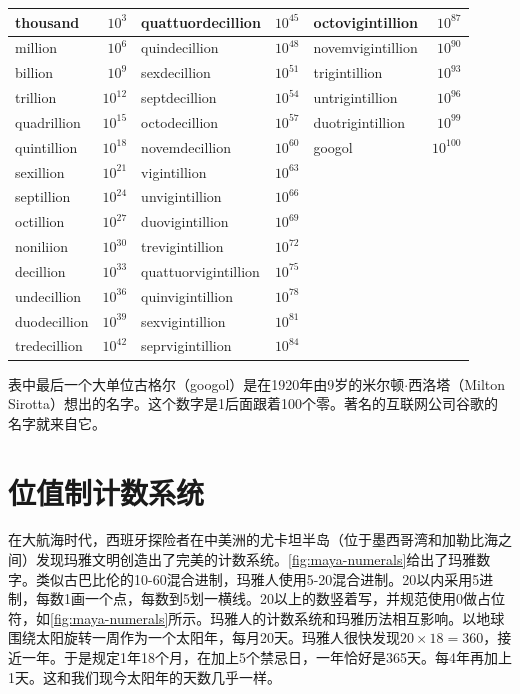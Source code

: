 \documentclass[b5paper]{ctexart}
\begin{document}
\begin{center}
\begin{tabular}{|l|r|l|r|l|r|}
\hline
thousand & $10^{3}$ & quattuordecillion & $10^{45}$ & octovigintillion & $10^{87}$ \\
\hline
million & $10^{6}$ & quindecillion & $10^{48}$ & novemvigintillion & $10^{90}$ \\
\hline
billion & $10^{9}$ & sexdecillion & $10^{51}$ & trigintillion & $10^{93}$ \\
\hline
trillion  & $10^{12}$ & septdecillion & $10^{54}$ & untrigintillion & $10^{96}$ \\
\hline
quadrillion  & $10^{15}$ & octodecillion & $10^{57}$ & duotrigintillion & $10^{99}$ \\
\hline
quintillion  & $10^{18}$ & novemdecillion & $10^{60}$ & googol & $10^{100}$ \\
\hline
sexillion    & $10^{21}$ & vigintillion & $10^{63}$ & & \\
\hline
septillion   & $10^{24}$ & unvigintillion & $10^{66}$ & & \\
\hline
octillion    & $10^{27}$ & duovigintillion & $10^{69}$ & & \\
\hline
noniliion  & $10^{30}$ & trevigintillion & $10^{72}$ & & \\
\hline
decillion  & $10^{33}$ & quattuorvigintillion & $10^{75}$ & & \\
\hline
undecillion   & $10^{36}$ & quinvigintillion & $10^{78}$ & & \\
\hline
duodecillion  & $10^{39}$ & sexvigintillion & $10^{81}$ & & \\
\hline
tredecillion  & $10^{42}$ & seprvigintillion & $10^{84}$ & & \\
\hline
\end{tabular}
\end{center}

表中最后一个大单位古格尔（googol）是在1920年由9岁的米尔顿$\cdot$西洛塔（Milton Sirotta）想出的名字。这个数字是1后面跟着100个零。著名的互联网公司谷歌的名字就来自它。

\section{位值制计数系统}
  

在大航海时代，西班牙探险者在中美洲的尤卡坦半岛（位于墨西哥湾和加勒比海之间）发现玛雅文明创造出了完美的计数系统。\cref{fig:maya-numerals}给出了玛雅数字。类似古巴比伦的10-60混合进制，玛雅人使用5-20混合进制。20以内采用5进制，每数1画一个点，每数到5划一横线。20以上的数竖着写，并规范使用0做占位符，如\cref{fig:maya-numerals}所示。玛雅人的计数系统和玛雅历法相互影响。以地球围绕太阳旋转一周作为一个太阳年，每月20天。玛雅人很快发现$20 \times 18 = 360$，接近一年。于是规定1年18个月，在加上5个禁忌日，一年恰好是365天。每4年再加上1天。这和我们现今太阳年的天数几乎一样。
\end{document}

